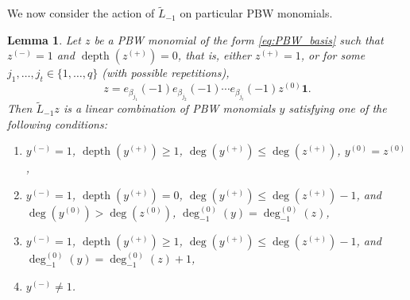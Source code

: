 \documentclass[JEP,XML,SOM,Unicode]{cedram}
\let\be\beta
\DeclareMathOperator{\dep}{depth}
\newtheorem{lem}[theorem]{Lemma}
\theoremstyle{definition}
\begin{document}
We now consider the action of $\tilde{L}_{-1}$ on particular PBW monomials.
\begin{lem}
\label{lem:Sugawara_bracket}
Let $z$ be a PBW monomial of the form \eqref{eq:PBW_basis}
such that $z^{(-)}=1$ and $\dep(z^{(+)})=0$, that is,
either $z^{(+)}=1$, or for some $j_1,\dots,j_t \in \{1,\dots,q\}$
(with possible repetitions),\vspace*{-3pt}
\begin{equation*}
z = e_{\be_{j_1}}(-1)e_{\be_{j_2}}(-1)\cdots e_{\be_{j_t}}(-1) z ^{(0)} \mathbf{1}.
\end{equation*}
Then $\tilde{L}_{-1}z$
is a linear combination of PBW monomials $y$ satisfying one of the following
conditions:
\begin{enumerate}
\item\label{lem:Sugawara_bracket1}
$\!y^{(-)}=1$, $\dep(y^{(+)})\geq 1$, $\deg(y^{(+)})\leq \deg(z^{(+)})$,
$y^{(0)}=z^{(0)}$,
\item\label{lem:Sugawara_bracket2}
$\!y^{(-)}\!=\!1$, $\dep(y^{(+)})\!=\!0$, $\deg (y^{(+)})\!\leq\! \deg (z^{(+)})-1$, and
$\deg(y^{(0)})\!>\!\deg(z^{(0)})$, $\deg_{-1}^{(0)}(y)=\deg_{-1}^{(0)}(z)$,
\item\label{lem:Sugawara_bracket3}
$\!y^{(-)}\!=\!1$, $\dep(y^{(+)})\!\geq\!1$, $\deg(y^{(+)})\!\leq\!\deg(z^{(+)})-1$, and \hbox{$\deg_{-1}^{(0)}(y)\!=\!\deg_{-1}^{(0)}(z)\!+\!1$},
\item\label{lem:Sugawara_bracket4}
$\!y^{(-)}\neq 1$.
\end{enumerate}
\end{lem}
\end{document}
